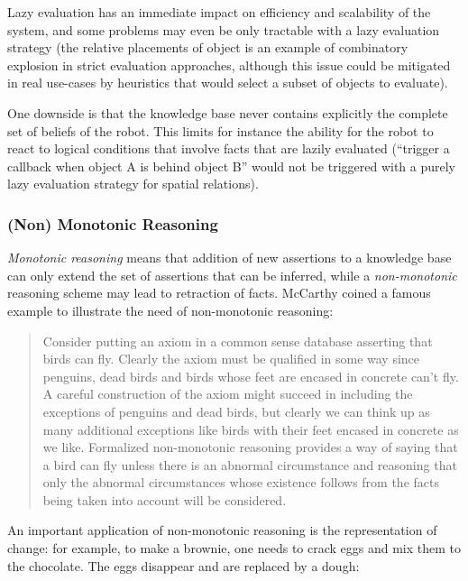 Lazy evaluation has an immediate impact on efficiency and scalability of the
system, and some problems may even be only tractable with a lazy evaluation
strategy (the relative placements of object is an example of combinatory
explosion in strict evaluation approaches, although this issue could be
mitigated in real use-cases by heuristics that would select a subset of objects
to evaluate).

One downside is that the knowledge base never contains explicitly the complete
set of beliefs of the robot. This limits for instance the ability for the robot
to react to logical conditions that involve facts that are lazily evaluated
(``trigger a callback when object A is behind object B'' would not be triggered
with a purely lazy evaluation strategy for spatial relations).


\subsubsection{(Non) Monotonic Reasoning}

\emph{Monotonic reasoning} means that addition of new assertions to a knowledge base
can only extend the set of assertions that can be inferred, while a
\emph{non-monotonic} reasoning scheme may lead to retraction of facts.
McCarthy coined a famous example to illustrate the need of non-monotonic reasoning:

\begin{quotation}
Consider putting an axiom in a common sense database asserting that birds can
fly. Clearly the axiom must be qualified in some way since penguins, dead birds
and birds whose feet are encased in concrete can't fly. A careful construction
of the axiom might succeed in including the exceptions of penguins and dead
birds, but clearly we can think up as many additional exceptions like birds
with their feet encased in concrete as we like. Formalized non-monotonic
reasoning provides a way of saying that a bird can fly unless there
is an abnormal circumstance and reasoning that only the abnormal circumstances
whose existence follows from the facts being taken into account will be
considered.
\end{quotation}

An important application of non-monotonic reasoning is the representation of
change: for example, to make a brownie, one needs to crack eggs and mix them to the chocolate.
The eggs disappear and are replaced by a dough:

